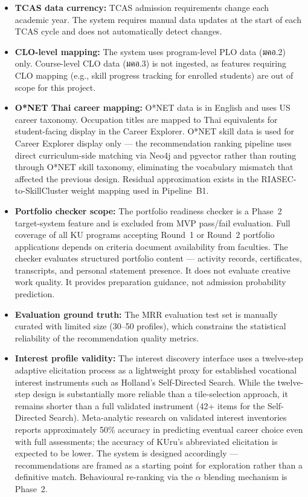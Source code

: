 \begin{itemize}[leftmargin=80pt]
    \item \textbf{TCAS data currency:} TCAS admission requirements change each academic year. The system requires manual data updates at the start of each TCAS cycle and does not automatically detect changes.

    \item \textbf{CLO-level mapping:} The system uses program-level PLO data (มคอ.2) only. Course-level CLO data (มคอ.3) is not ingested, as features requiring CLO mapping (e.g., skill progress tracking for enrolled students) are out of scope for this project.

    \item \textbf{O*NET Thai career mapping:} O*NET data is in English and uses US career taxonomy. Occupation titles are mapped to Thai equivalents for student-facing display in the Career Explorer. O*NET skill data is used for Career Explorer display only --- the recommendation ranking pipeline uses direct curriculum-side matching via Neo4j and pgvector rather than routing through O*NET skill taxonomy, eliminating the vocabulary mismatch that affected the previous design. Residual approximation exists in the RIASEC-to-SkillCluster weight mapping used in Pipeline~B1.

    \item \textbf{Portfolio checker scope:} The portfolio readiness checker is a Phase~2 target-system feature and is excluded from MVP pass/fail evaluation. Full coverage of all KU programs accepting Round~1 or Round~2 portfolio applications depends on criteria document availability from faculties. The checker evaluates structured portfolio content --- activity records, certificates, transcripts, and personal statement presence. It does not evaluate creative work quality. It provides preparation guidance, not admission probability prediction.

    \item \textbf{Evaluation ground truth:} The MRR evaluation test set is manually curated with limited size (30--50 profiles), which constrains the statistical reliability of the recommendation quality metrics.

    \item \textbf{Interest profile validity:} The interest discovery interface uses a twelve-step adaptive elicitation process as a lightweight proxy for established vocational interest instruments such as Holland's Self-Directed Search. While the twelve-step design is substantially more reliable than a tile-selection approach, it remains shorter than a full validated instrument (42+ items for the Self-Directed Search). Meta-analytic research on validated interest inventories reports approximately 50\% accuracy in predicting eventual career choice even with full assessments; the accuracy of KUru's abbreviated elicitation is expected to be lower. The system is designed accordingly --- recommendations are framed as a starting point for exploration rather than a definitive match. Behavioural re-ranking via the $\alpha$ blending mechanism is Phase~2.


\end{itemize}
